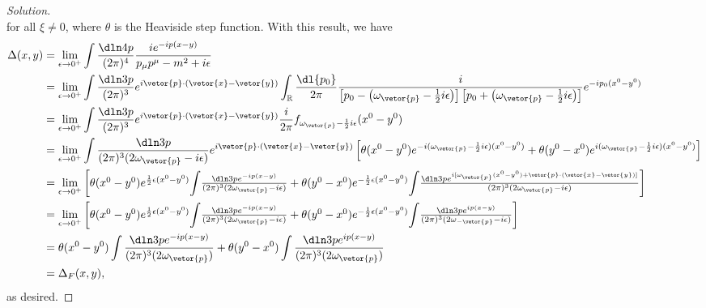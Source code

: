 \begin{proof}[Solution]
\begin{equation*}
   \end{equation*}
   for all \(\xi \neq 0\), where \(\theta\) is the Heaviside step function. With this result, we have
   \begin{align*}
      \Delta(x,y)&=\lim_{\epsilon \to 0^+}{\int \frac{\dln4p}{(2\pi)^4} \frac{i e^{-ip(x - y)}}{p_\mu p^\mu - m^2 + i \epsilon}}\\
      &= \lim_{\epsilon \to 0^+}{\int \frac{\dln3p}{(2\pi)^3} e^{i \vetor{p} \cdot (\vetor{x} - \vetor{y})}\int_{\mathbb{R}} \frac{\dl{p_0}}{2\pi} \frac{i}{\left[p_0 - \left(\omega_{\vetor{p}} - \frac12 i\epsilon\right)\right]\left[p_0 + \left(\omega_{\vetor{p}} - \frac12i \epsilon\right)\right]}}e^{-ip_0 (x^0 - y^0)}\\
      &= \lim_{\epsilon \to 0^+}{\int \frac{\dln3p}{(2\pi)^3} e^{i \vetor{p} \cdot (\vetor{x} - \vetor{y})} \frac{i}{2\pi}f_{\omega_{\vetor{p}} - \frac12 i \epsilon}(x^0 - y^0)}\\
      &= \lim_{\epsilon \to 0^+} \int \frac{\dln3p}{(2\pi)^3 (2 \omega_{\vetor{p}} - i \epsilon)} e^{i \vetor{p} \cdot (\vetor{x} - \vetor{y})} \left[\theta(x^0 - y^0) e^{-i (\omega_{\vetor{p}} - \frac12 i \epsilon) (x^0 - y^0)} + \theta(y^0 - x^0) e^{i (\omega_{\vetor{p}} - \frac12 i \epsilon)(x^0 - y^0)}\right]\\
      &= \lim_{\epsilon\to0^+}\textstyle\left[\theta(x^0 - y^0) e^{\frac12 \epsilon (x^0 - y^0)}{\displaystyle\int}\frac{\dln3p e^{-i p (x - y)}}{(2\pi)^3(2 \omega_{\vetor{p}}- i \epsilon)}  + \theta(y^0 - x^0) e^{-\frac12 \epsilon (x^0 - y^0)} {\displaystyle\int}\frac{\dln3p e^{i[\omega_{\vetor{p}}(x^0 - y^0) + \vetor{p}\cdot (\vetor{x} - \vetor{y})]}}{(2\pi)^3(2 \omega_{\vetor{p}} - i \epsilon)}\right]\\
      &= \lim_{\epsilon\to0^+}\textstyle\left[\theta(x^0 - y^0) e^{\frac12 \epsilon (x^0 - y^0)}{\displaystyle\int}\frac{\dln3p e^{-i p (x - y)}}{(2\pi)^3(2 \omega_{\vetor{p}}- i \epsilon)}  + \theta(y^0 - x^0) e^{-\frac12 \epsilon (x^0 - y^0)} {\displaystyle\int}\frac{\dln3p e^{i p (x - y)}}{(2\pi)^3(2 \omega_{-\vetor{p}} - i \epsilon)}\right]\\
      &= \theta(x^0 - y^0) \int \frac{\dln3p e^{-ip(x - y)}}{(2\pi)^3(2\omega_{\vetor{p}})} + \theta(y^0 - x^0) \int \frac{\dln3p e^{ip(x - y)}}{(2\pi)^3(2\omega_{\vetor{p}})}\\
      &= \Delta_F(x,y),
   \end{align*}
   as desired.
\end{proof}
